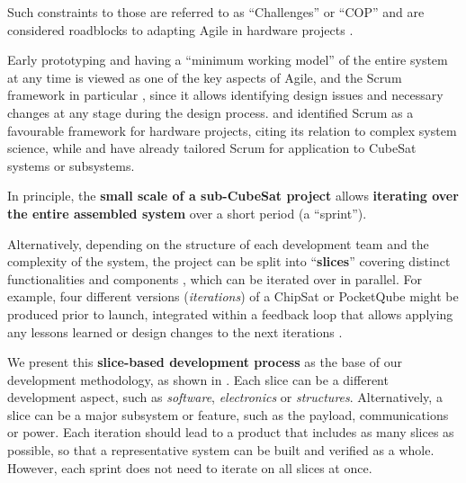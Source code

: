 \documentclass[journal,10pt]{IEEEtran}
\begin{document}
Such constraints to those are referred to as ``Challenges'' \autocite{ullman13ChallengesWhen2019} or ``\acl{COP}'' \autocite{schmidtAgileDevelopmentConstraints2017} and are considered roadblocks to adapting Agile in hardware projects \autocite{petersonWhenWorldsCollide2021}.


Early prototyping and having a ``minimum working model'' of the entire system at any time is viewed as one of the key aspects of Agile, and the Scrum framework in particular \autocite{schwaverDefinitiveGuideScrum2020}, since it allows identifying design issues and necessary changes at any stage during the design process.
\citeauthor{doveFundamentalsAgileSystems2014} \autocite{doveFundamentalsAgileSystems2014} and
\citeauthor{bottAnalysisTheoriesSupporting2019} \autocite{bottAnalysisTheoriesSupporting2019} identified Scrum as a favourable framework for hardware projects, citing its relation to complex system science,
while \mbox{\citeauthor{honore-livermoreDigitalEngineeringDevelopment2022}} \mbox{\autocite{honore-livermoreDigitalEngineeringDevelopment2022}} and \mbox{\citeauthor{garzanitiEffectivenessScrumMethodology2019}} \mbox{\autocite{garzanitiEffectivenessScrumMethodology2019}} have already tailored Scrum for application to CubeSat systems or subsystems.%

In principle, the \textbf{small scale of a sub-CubeSat project} allows \textbf{iterating over the entire assembled system} over a short period (a ``sprint'').

Alternatively, depending on the structure of each development team and the complexity of the system, the project can be split into ``\textbf{slices}'' covering distinct functionalities and components \autocite{iberleAgileGetsPhysical2022a}, which can be iterated over in parallel.
For example, four different versions (\emph{iterations}) of a ChipSat or PocketQube might be produced prior to launch, integrated within a feedback loop that allows applying any lessons learned or design changes to the next iterations \autocite{kanavourasAgileSystemsEngineering2022}.

We present this \textbf{slice-based development process} as the base of our development methodology, as shown in . Each slice can be a different development aspect, such as \emph{software}, \emph{electronics} or \emph{structures}. Alternatively, a slice can be a major subsystem or feature, such as the payload, communications or power. Each iteration should lead to a product that includes as many slices as possible, so that a representative system can be built and verified as a whole. However, each sprint does not need to iterate on all slices at once.
\end{document}
